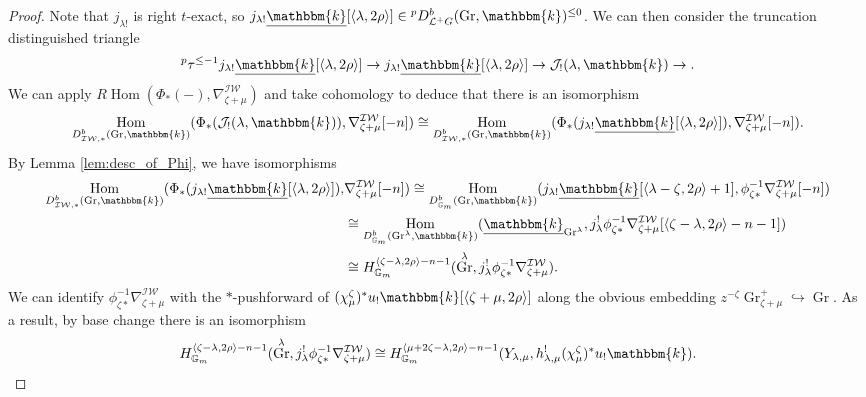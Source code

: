 \documentclass[10pt,a4paper]{amsart}
\newcommand{\G}{\mathbb{G}}
\DeclareMathOperator{\Gr}{Gr}
\DeclareMathOperator{\Hom}{Hom}
\newcommand{\IW}{\mathcal{IW}}
\renewcommand{\L}{\mathcal{L}}
\renewcommand{\k}{\mathbbm{k}}
\newcommand{\scrJ}{\mathcal{J}}
\newcommand{\uk}{\underline{\k}}
\begin{document}
    \begin{proof}
        Note that $j_{\lambda !}$ is right $t$-exact, so $j_{\lambda !} \uk [\langle \lambda, 2\rho \rangle] \in {}^p D_{\L^+ G}^b (\Gr, \k)^{\leq 0}$.
        We can then consider the truncation distinguished triangle
        \[{}^p \tau^{\leq -1} j_{\lambda !} \uk [\langle \lambda, 2\rho \rangle] \to j_{\lambda !} \uk [\langle \lambda, 2\rho \rangle] \to \scrJ_! (\lambda, \k) \to.\]
        We can apply $R\Hom (\Phi_* (-), \nabla_{\zeta + \mu}^{\IW})$ and take cohomology to deduce that there is an isomorphism
        \[\Hom_{D_{\IW, *}^b (\Gr, \k)} (\Phi_* (\scrJ_! (\lambda, \k)), \nabla_{\zeta + \mu}^{\IW} [-n]) \cong \Hom_{D_{\IW, *}^b (\Gr, \k)} (\Phi_* (j_{\lambda !} \uk [\langle \lambda, 2\rho \rangle]), \nabla_{\zeta + \mu}^{\IW} [-n]). \]
         By Lemma \ref{lem:desc_of_Phi}, we have isomorphisms
         \begin{align*}
         \Hom_{D_{\IW, *}^b (\Gr, \k)} (\Phi_* (j_{\lambda !} \uk [\langle \lambda, 2\rho \rangle]), &\nabla_{\zeta + \mu}^{\IW} [-n]) \cong \Hom_{D_{\G_m}^b (\Gr, \k)} ( j_{\lambda !} \uk [\langle \lambda - \zeta, 2\rho \rangle + 1],  \phi_{\zeta *}^{-1} \nabla_{\zeta + \mu}^{\IW} [-n])          \\
         &\cong \Hom_{D_{\G_m}^b (\Gr^{\lambda}, \k)} (\uk_{\Gr^{\lambda}},  j_{\lambda}^! \phi_{\zeta *}^{-1} \nabla_{\zeta + \mu}^{\IW} [\langle \zeta - \lambda, 2\rho \rangle - n - 1]) \\
         &\cong H_{\G_m}^{\langle \zeta - \lambda, 2\rho \rangle - n - 1} (\Gr^{\lambda}, j_{\lambda}^! \phi_{\zeta *}^{-1} \nabla_{\zeta + \mu}^{\IW}).
         \end{align*}
         We can identify $\phi_{\zeta *}^{-1} \nabla_{\zeta + \mu}^{\IW}$ with the $*$-pushforward of $(\chi_{\mu}^{\zeta})^* u_! \k [\langle \zeta + \mu, 2\rho \rangle]$ along the obvious embedding $z^{-\zeta} \Gr_{\zeta + \mu}^+ \hookrightarrow \Gr$.
         As a result, by base change there is an isomorphism
         \[H_{\G_m}^{\langle \zeta - \lambda, 2\rho \rangle - n - 1} (\Gr^{\lambda}, j_{\lambda}^! \phi_{\zeta *}^{-1} \nabla_{\zeta + \mu}^{\IW}) \cong H_{\G_m}^{\langle \mu + 2\zeta - \lambda, 2\rho \rangle - n - 1} (Y_{\lambda, \mu}, h_{\lambda, \mu}^! (\chi_{\mu}^{\zeta})^* u_! \k). \]


\end{proof}
\end{document}
